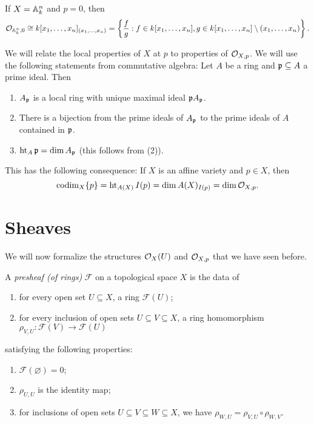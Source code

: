 \begin{example}
  If $X = \mathbb{A}^n_k$ and $p = 0$, then
  \[
    \mathcal{O}_{\mathbb{A}_k^n, 0}
    \cong k[x_1, \ldots, x_n]_{(x_1, \ldots, x_n)}
    =
    \left\{ \frac{f}{g} : f \in k[x_1, \dots, x_n], g \in k[x_1, \ldots, x_n] \setminus (x_1, \dots, x_n) \right\}.
  \]
\end{example}

\begin{remark}
  We will relate the
  local properties of $X$ at $p$
  to properties of
  $\mathcal{O}_{X, p}$. We will use the following
  statements from commutative algebra:
  Let $A$ be a ring and
  $\mathfrak{p} \subseteq A$ a prime ideal. Then
  \begin{enumerate}
    \item $A_{\mathfrak{p}}$ is a local ring with
      unique maximal ideal $\mathfrak{p} A_{\mathfrak{p}}$.
    \item There is a bijection from the
      prime ideals of $A_{\mathfrak{p}}$ to
      the prime ideals of $A$ contained
      in $\mathfrak{p}$.
    \item $\operatorname{ht}_A \mathfrak{p} = \dim A_{\mathfrak{p}}$
      (this follows from (2)).
  \end{enumerate}
  This has the following
  consequence: If $X$ is an affine
  variety and $p \in X$, then
  \[\operatorname{codim}_X \{p\} = \operatorname{ht}_{A(X)} I(p) = \dim A(X)_{I(p)} = \dim \mathcal{O}_{X, p}.\]
\end{remark}

\section{Sheaves}

\begin{remark}
  We will now formalize the structures
  $\mathcal{O}_X(U)$ and $\mathcal{O}_{X, p}$ that
  we have seen before.
\end{remark}

\begin{definition}
  A \emph{presheaf (of rings)}
  $\mathcal{F}$ on a topological space
  $X$ is the data of
  \begin{enumerate}
    \item for every open
      set $U \subseteq X$, a ring
      $\mathcal{F}(U)$;
    \item for every inclusion of
      open sets $U \subseteq V \subseteq X$,
      a ring homomorphism
      $\rho_{V, U} : \mathcal{F}(V) \to \mathcal{F}(U)$
  \end{enumerate}
  satisfying the following properties:
  \begin{enumerate}
    \item $\mathcal{F}(\varnothing) = 0$;
    \item $\rho_{U, U}$ is the identity
      map;
    \item for inclusions of
      open sets $U \subseteq V \subseteq W \subseteq X$,
      we have
      $\rho_{W, U} = \rho_{V, U} \circ \rho_{W, V}$.
  \end{enumerate}
\end{definition}

